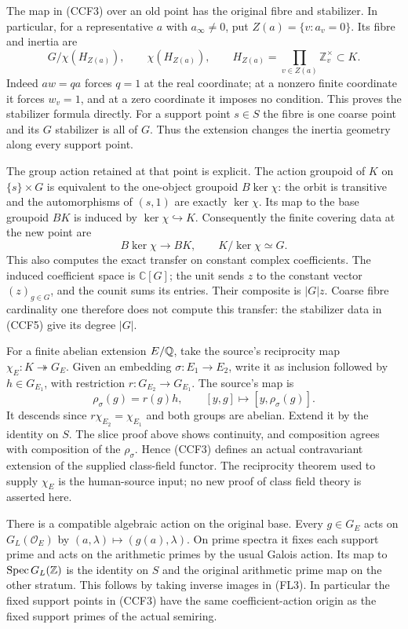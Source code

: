 The map in (CCF3) over an old point has the original fibre and
stabilizer. In particular, for a representative $a$ with
$a_\infty\ne0$, put $Z(a)=\{v:a_v=0\}$. Its fibre and inertia are
\[
 G/\chi(H_{Z(a)}),\qquad \chi(H_{Z(a)}),\qquad
 H_{Z(a)}=\prod_{v\in Z(a)}\mathbb Z_v^\times\subset K.
 \tag{CCF4}
\]
Indeed $aw=qa$ forces $q=1$ at the real coordinate; at a nonzero
finite coordinate it forces $w_v=1$, and at a zero coordinate it
imposes no condition. This proves the stabilizer formula directly.
For a support point $s\in S$ the fibre is one coarse point and its
$G$ stabilizer is all of $G$. Thus the extension changes the
inertia geometry along every support point.

The group action retained at that point is explicit. The action
groupoid of $K$ on $\{s\}\times G$ is equivalent to the one-object
groupoid $B\ker\chi$: the orbit is transitive and the automorphisms
of $(s,1)$ are exactly $\ker\chi$. Its map to the base groupoid
$BK$ is induced by $\ker\chi\hookrightarrow K$. Consequently
the finite covering data at the new point are
\[
 B\ker\chi\longrightarrow BK,\qquad K/\ker\chi\simeq G.
 \tag{CCF5}
\]
This also computes the exact transfer on constant complex
coefficients. The induced coefficient space is $\mathbb C[G]$;
the unit sends $z$ to the constant vector $(z)_{g\in G}$, and the
counit sums its entries. Their composite is $|G|z$. Coarse fibre
cardinality one therefore does not compute this transfer: the
stabilizer data in (CCF5) give its degree $|G|$.

For a finite abelian extension $E/\mathbb Q$, take the source's reciprocity
map $\chi_E:K\twoheadrightarrow G_E$. Given an embedding
$\sigma:E_1\to E_2$, write it as inclusion followed by $h\in G_{E_1}$,
with restriction $r:G_{E_2}\to G_{E_1}$. The source's map is
\[
 \rho_\sigma(g)=r(g)h,\qquad
 [y,g]\longmapsto[y,\rho_\sigma(g)].
 \tag{CCF6}
\]
It descends since $r\chi_{E_2}=\chi_{E_1}$ and both groups are
abelian. Extend it by the identity on $S$. The slice proof above
shows continuity, and composition agrees with composition of the
$\rho_\sigma$. Hence (CCF3) defines an actual contravariant
extension of the supplied class-field functor. The reciprocity
theorem used to supply $\chi_E$ is the human-source input; no
new proof of class field theory is asserted here.

There is a compatible algebraic action on the original base.
Every $g\in G_E$ acts on $G_L(\mathcal O_E)$ by
$(a,\lambda)\mapsto(g(a),\lambda)$. On prime spectra it fixes
each support prime and acts on the arithmetic primes by the usual
Galois action. Its map to $\operatorname{Spec} G_L(\mathbb Z)$ is the identity
on $S$ and the original arithmetic prime map on the other stratum.
This follows by taking inverse images in (FL3). In particular the
fixed support points in (CCF3) have the same coefficient-action
origin as the fixed support primes of the actual semiring.

